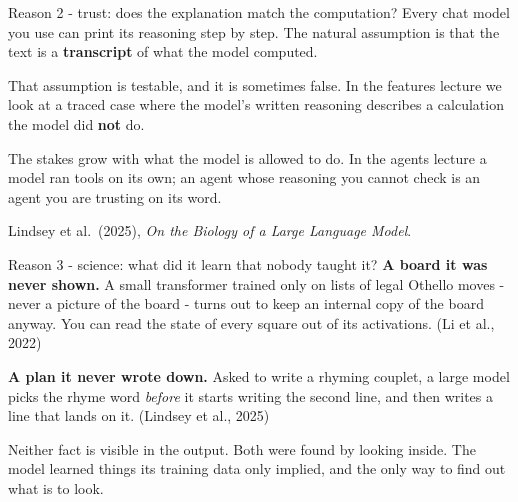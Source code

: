 \documentclass[aspectratio=169]{beamer}
\newcommand{\keybox}[1]{%
  \begin{tcolorbox}[colback=armblue!8, colframe=armblue, boxrule=0.6pt, arc=2pt]
  #1
  \end{tcolorbox}}
\newcommand{\trapbox}[1]{%
  \begin{tcolorbox}[colback=armred!8, colframe=armred, boxrule=0.6pt, arc=2pt]
  #1
  \end{tcolorbox}}
\begin{document}
\begin{frame}{Reason 2 - trust: does the explanation match the computation?}
  \vspace{0.6em}
  Every chat model you use can print its reasoning step by step. The natural assumption is that
  the text is a \textbf{transcript} of what the model computed.

  \vspace{0.8em}
  \trapbox{That assumption is testable, and it is sometimes false. In the features lecture we
  look at a traced case where the model's written reasoning describes a calculation the model did
  \textbf{not} do.}

  \vspace{0.8em}
  The stakes grow with what the model is allowed to do. In the agents lecture a model ran tools
  on its own; an agent whose reasoning you cannot check is an agent you are trusting on its word.

  \vspace{0.5em}
  {\footnotesize Lindsey et al.\ (2025), \emph{On the Biology of a Large Language Model}.}
\end{frame}

\begin{frame}{Reason 3 - science: what did it learn that nobody taught it?}
  \vspace{0.6em}
  \textbf{A board it was never shown.} A small transformer trained only on lists of legal Othello
  moves - never a picture of the board - turns out to keep an internal copy of the board anyway.
  You can read the state of every square out of its activations.
  {\footnotesize (Li et al., 2022)}

  \vspace{0.9em}
  \textbf{A plan it never wrote down.} Asked to write a rhyming couplet, a large model picks the
  rhyme word \emph{before} it starts writing the second line, and then writes a line that lands on
  it. {\footnotesize (Lindsey et al., 2025)}

  \vspace{1.0em}
  \keybox{Neither fact is visible in the output. Both were found by looking inside. The model
  learned things its training data only implied, and the only way to find out what is to look.}
\end{frame}
\end{document}
